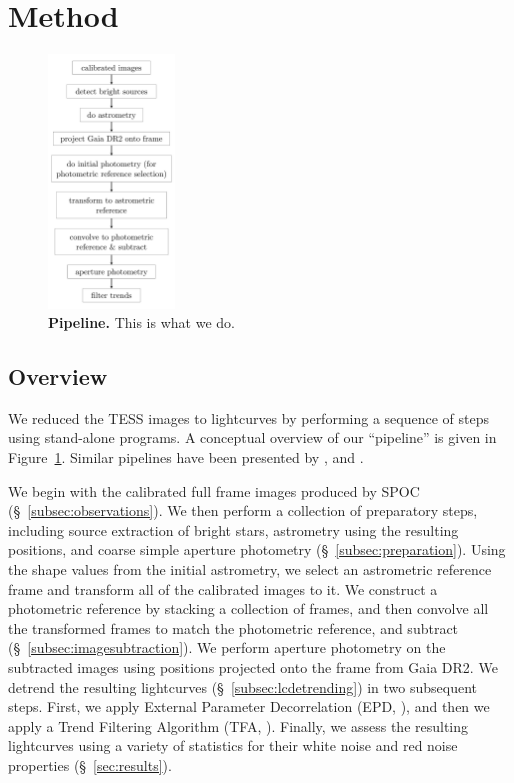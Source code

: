 \documentclass[12pt,twocolumn,tighten]{aastex62}
\begin{document}
\section{Method}
\label{sec:method}

\begin{figure}[t]
	\begin{center}
		\leavevmode
		\includegraphics[width=0.3\textwidth]{f2.pdf}
	\end{center}
	\vspace{-0.5cm}
	\caption{
    {\bf Pipeline.} This is what we do.
		\label{fig:pipeline}
	}
\end{figure}

\subsection{Overview}

We reduced the TESS images to lightcurves by performing a sequence of
steps using stand-alone programs.  A conceptual overview of our
``pipeline'' is given in Figure~\ref{fig:pipeline}.  Similar pipelines
have been presented by \citet{Pal_2009},
\citet{soares-furtado_image_2017} and \citet{oelkers_precision_2018}.

We begin with the calibrated full frame images produced by SPOC
(\S~\ref{subsec:observations}).  We then perform a collection of
preparatory steps, including source extraction of bright stars,
astrometry using the resulting positions, and coarse simple aperture
photometry (\S~\ref{subsec:preparation}).  Using the shape values from
the initial astrometry, we select an astrometric reference frame and
transform all of the calibrated images to it.  We construct a
photometric reference by stacking a collection of frames, and then
convolve all the transformed frames to match the photometric reference,
and subtract (\S~\ref{subsec:imagesubtraction}).  We perform aperture
photometry on the subtracted images using positions projected onto the
frame from Gaia DR2.  We detrend the resulting lightcurves
(\S~\ref{subsec:lcdetrending}) in two subsequent steps.  First, we apply
External Parameter Decorrelation (EPD, \citealt{bakos_2010}), and then
we apply a Trend Filtering Algorithm (TFA, \citealt{kovacs_trend_2005}).
Finally, we assess the resulting lightcurves using a variety of
statistics for their white noise and red noise properties
(\S~\ref{sec:results}).
\end{document}
